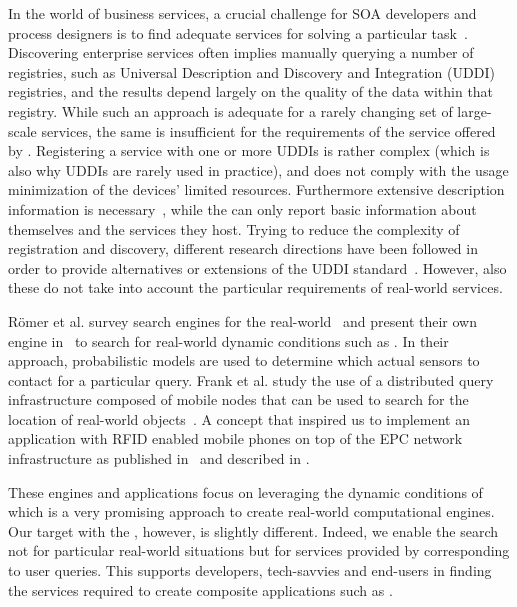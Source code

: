 In the world of business services, a crucial challenge for SOA developers and process designers is to find adequate services for solving a particular task~\cite{Crasso2008}. Discovering enterprise services often implies manually querying a number of registries, such as Universal Description and Discovery and Integration (UDDI) registries, and the results depend largely on the quality of the data within that registry. While such an approach is adequate for a rarely changing set of large-scale services, the same is insufficient for the requirements of the service offered by \sts{}. Registering a service with one or more UDDIs is rather complex (which is also why UDDIs are rarely used in practice), and does not comply with the usage minimization of the devices' limited resources. Furthermore extensive description information is necessary~\cite{Monson-Haefel2003}, while the \sts{} can only report basic information about themselves and the services they host. Trying to reduce the complexity of registration and discovery, different research directions have been followed in order to provide alternatives or extensions of the UDDI standard~\cite{Crasso2008,Song2007}. However, also these do not take into account the particular requirements of real-world services.  

R\"{o}mer et al. survey search engines for the real-world~\cite{Romer2010} and present their own engine in~\cite{Ostermaier2010} to search for real-world dynamic conditions such as . In their approach, probabilistic models are used to determine which actual sensors to contact for a particular query. Frank et al. study the use of a distributed query infrastructure composed of mobile nodes that can be used to search for the location of real-world objects~\cite{Frank2007,Frank2008}. A concept that inspired us to implement an application with RFID enabled mobile phones on top of the EPC network infrastructure as published in~\cite{Guinard2008} and described in .

These engines and applications focus on leveraging the dynamic conditions of \sts{} which is a very promising approach to create real-world computational engines. Our target with the \findLayer{}, however, is slightly different. Indeed, we enable the search not for particular real-world situations but for services provided by \sts{} corresponding to user queries. This supports developers, tech-savvies and end-users in finding the services required to create composite applications such as \pMashups{}.

